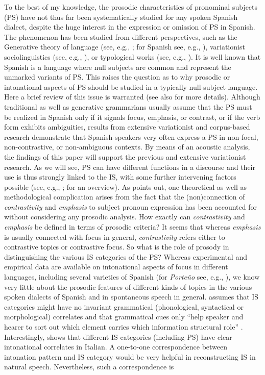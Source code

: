 \documentclass[output=paper]{langsci/langscibook}
\begin{document}
To the best of my knowledge, the prosodic characteristics of pronominal subjects (PS) have not thus far been systematically studied for any spoken Spanish dialect, despite the huge interest in the expression or omission of PS in Spanish. The phenomenon has been studied from different perspectives, such as the Generative theory of language (see, e.g., \citealt{Chomsky1981,Chomsky1995,Rizzi1986,Biberauer2010}; for Spanish see, e.g., \citealt{Lujan1999}), variationist sociolinguistics (see, e.g., \citealt{SilvaCorvalan.2001,Otheguy2007,Carvalho2015}), or typological works (see, e.g., \citealt{Dryer2013}). It is well known that Spanish is a language where null subjects are common and represent the unmarked variants of PS. This raises the question as to why prosodic or intonational aspects of PS should be studied in a typically null-subject language. Here a brief review of this issue is warranted (see also  for more details). Although traditional as well as generative grammarians usually assume that the PS must be realized in Spanish only if it signals focus, emphasis, or contrast, or if the verb form exhibits ambiguities, results from extensive variationist and corpus-based research demonstrate that Spanish-speakers very often express a PS in non-focal, non-contrastive, or non-ambiguous contexts. By means of an acoustic analysis, the findings of this paper will support the previous and extensive variationist research. As we will see, PS can have different functions in a discourse and their use is thus strongly linked to the IS, with some further intervening factors possible (see, e.g., \citealt{Carvalho2015,Peskova.2015}; for an overview). As \citet[14]{Posio2012} points out, one theoretical as well as methodological complication arises from the fact that the (non)connection of \textit{contrastivity} and \textit{emphasis} to subject pronoun expression has been accounted for without considering any prosodic analysis. How exactly can \textit{contrastivity} and \textit{emphasis} be defined in terms of prosodic criteria? It seems that whereas \textit{emphasis} is usually connected with focus in general, \textit{contrastivity} refers either to contrastive topics or contrastive focus. So what is the role of prosody in distinguishing the various IS categories of the PS? Whereas experimental and empirical data are available on intonational aspects of focus in different languages, including several varieties of Spanish (for \textit{Porte{\~n}o} see, e.g., \citealt{Colantoni2004,Gabriel2010incollection,Feldhausen2011,LeGac2014}), we know very little about the prosodic features of different kinds of topics in the various spoken dialects of Spanish and in spontaneous speech in general. \citet{Fery.2007} assumes that IS categories might have no invariant grammatical (phonological, syntactical or morphological) correlates and that grammatical cues only ``help speaker and hearer to sort out which element carries which information structural role'' \citep[161]{Fery.2007}. Interestingly, \citet{Frascarelli2007} shows that different IS categories (including PS) have clear intonational correlates in Italian. A one-to-one correspondence between intonation pattern and IS category would be very helpful in reconstructing IS in natural speech. Nevertheless, such a correspondence is 
\end{document}
